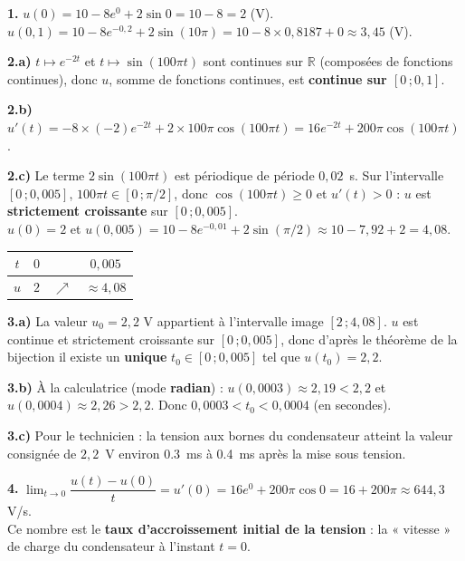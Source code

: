\documentclass[11pt]{article}
\begin{document}
\begin{corrige}
\textbf{1.} $u(0)=10-8e^{0}+2\sin 0=10-8=2$ (V).\\
$u(0{,}1)=10-8e^{-0{,}2}+2\sin(10\pi)=10-8\times 0{,}8187+0\approx 3{,}45$ (V).

\textbf{2.a)} $t\mapsto e^{-2t}$ et $t\mapsto\sin(100\pi t)$ sont continues sur $\mathbb{R}$ (composées de fonctions continues), donc $u$, somme de fonctions continues, est \textbf{continue sur $[0\,;0{,}1]$}.

\textbf{2.b)} $u'(t)=-8\times(-2)e^{-2t}+2\times 100\pi\cos(100\pi t)=16e^{-2t}+200\pi\cos(100\pi t)$.

\textbf{2.c)} Le terme $2\sin(100\pi t)$ est périodique de période $0{,}02$~s. Sur l'intervalle $[0\,;0{,}005]$, $100\pi t\in[0\,;\pi/2]$, donc $\cos(100\pi t)\geq 0$ et $u'(t)>0$ : $u$ est \textbf{strictement croissante} sur $[0\,;0{,}005]$.\\
$u(0)=2$ et $u(0{,}005)=10-8e^{-0{,}01}+2\sin(\pi/2)\approx 10-7{,}92+2=4{,}08$.
\begin{center}\begin{tabular}{|c|ccc|}\hline $t$ & $0$ & & $0{,}005$ \\ \hline $u$ & $2$ & $\nearrow$ & $\approx 4{,}08$ \\ \hline\end{tabular}\end{center}

\textbf{3.a)} La valeur $u_0=2{,}2$ V appartient à l'intervalle image $[2\,;4{,}08]$. $u$ est continue et strictement croissante sur $[0\,;0{,}005]$, donc d'après le théorème de la bijection il existe un \textbf{unique} $t_0\in[0\,;0{,}005]$ tel que $u(t_0)=2{,}2$.

\textbf{3.b)} À la calculatrice (mode \textbf{radian}) : $u(0{,}0003)\approx 2{,}19<2{,}2$ et $u(0{,}0004)\approx 2{,}26>2{,}2$. Donc $\boxed{0{,}0003<t_0<0{,}0004}$ (en secondes).

\textbf{3.c)} Pour le technicien : la tension aux bornes du condensateur atteint la valeur consignée de $2{,}2$~V environ \SI{0,3}{ms} à \SI{0,4}{ms} après la mise sous tension.

\textbf{4.} $\displaystyle\lim_{t\to 0}\dfrac{u(t)-u(0)}{t}=u'(0)=16e^{0}+200\pi\cos 0=16+200\pi\approx 644{,}3$ V/s.\\
Ce nombre est le \textbf{taux d'accroissement initial de la tension} : la « vitesse » de charge du condensateur à l'instant $t=0$.


\end{corrige}
\end{document}
